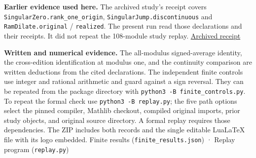 \documentclass[11pt,letterpaper]{article}
\begin{document}
\textbf{Earlier evidence used here.} The archived study's receipt covers \nolinkurl{SingularZero.rank_one_origin}, \nolinkurl{SingularJump.discontinuous} and \nolinkurl{RamDilate.original} / \nolinkurl{realized}. The present run read those declarations and their receipts. It did not repeat the 108-module study replay. \href{https://github.com/nousentllc/riemann-hypothesis/blob/17263859a4d27c62cfc67571737355f61a080806/research/uriel/experiments/ramified-square-dilates/verification/receipt.json}{Archived receipt}

\textbf{Written and numerical evidence.} The all-modulus signed-average identity, the cross-edition identification at modulus one, and the continuity comparison are written deductions from the cited declarations. The independent finite controls use integer and rational arithmetic and guard against a sign reversal. They can be repeated from the package directory with \nolinkurl{python3 -B finite_controls.py}. To repeat the formal check use \nolinkurl{python3 -B replay.py}; the five path options select the pinned compiler, Mathlib checkout, compiled original imports, prior study objects, and original source directory. A formal replay requires those dependencies. The ZIP includes both records and the single editable LuaLaTeX file with its logo embedded. Finite results (\nolinkurl{finite_results.json}) · Replay program (\nolinkurl{replay.py})
\end{document}
